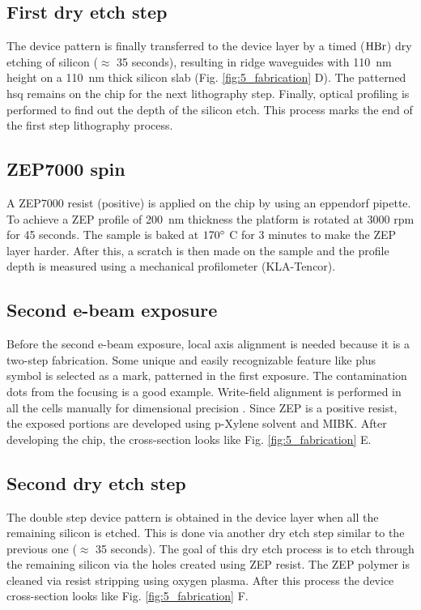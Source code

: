 \documentclass[../report.tex]{subfiles}
\begin{document}
\subsection{First dry etch step}
The device pattern is finally transferred to the device layer by a timed ($\mathrm{HBr}$) dry etching of silicon ($\approx$ 35 seconds), resulting in ridge waveguides with \SI{110}{\nano \meter} height on a \SI{110}{\nano \meter} thick silicon slab (Fig. \ref{fig:5_fabrication} D). The patterned \gls{hsq} remains on the chip for the next lithography step. Finally, optical profiling is performed to find out the depth of the silicon etch. This process marks the end of the first step lithography process.

\subsection{ZEP7000 spin}
A ZEP7000 resist (positive) is applied on the chip by using an eppendorf pipette. To achieve a ZEP profile of \SI{200}{\nano \meter} thickness the platform is rotated at 3000 rpm for 45 seconds. The sample is baked at $\mathrm{170^{\circ}}$ C for 3 minutes to make the ZEP layer harder. After this, a scratch is then made on the sample and the profile depth is measured using a mechanical profilometer (KLA-Tencor).

\subsection{Second e-beam exposure}
Before the second e-beam exposure, local axis alignment is needed because it is a two-step fabrication. Some unique and easily recognizable feature like plus symbol is selected as a mark, patterned in the first exposure. The contamination dots from the focusing is a good example. Write-field alignment is performed in all the cells manually for dimensional precision \cite{write_field}. Since ZEP is a positive resist, the exposed portions are developed using p-Xylene solvent and MIBK. After developing the chip, the cross-section looks like Fig. \ref{fig:5_fabrication} E.

\subsection{Second dry etch step}
The double step device pattern is obtained in the device layer when all the remaining silicon is etched. This is done via another dry etch step similar to the previous one ($\approx$ 35 seconds). The goal of this dry etch process is to etch through the remaining silicon via the holes created using ZEP resist. The ZEP polymer is cleaned via resist stripping using oxygen plasma. After this process the device cross-section looks like Fig. \ref{fig:5_fabrication} F. 
\end{document}

